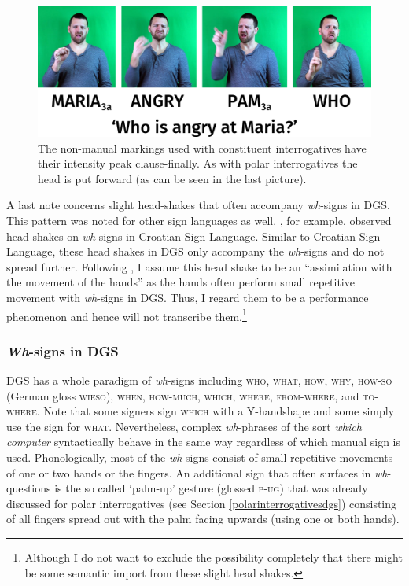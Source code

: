 \begin{figure}[bt]
\centering
	\includegraphics[width=1.0\textwidth]{whnonmanualsexample.jpg}
	\caption{The non-manual markings used with constituent interrogatives have their intensity peak clause-finally. As with polar interrogatives the head is put forward (as can be seen in the last picture).}
	\label{nnmwhatwhotwo}
\end{figure}

A last note concerns slight head-shakes that often accompany \textit{wh}-signs in DGS. This pattern was noted for other sign languages as well. \citet[232--235]{sarac2007cross}, for example, observed head shakes on \textit{wh}-signs in Croatian Sign Language. Similar to Croatian Sign Language, these head shakes in DGS only accompany the \textit{wh}-signs and do not spread further. Following \citet[235]{sarac2007cross}, I assume this head shake to be an ``assimilation with the movement of the hands'' as the hands often perform small repetitive movement with \textit{wh}-signs in DGS. Thus, I regard them to be a performance phenomenon and hence will not transcribe them.\footnote{ Although I do not want to exclude the possibility completely that there might be some semantic import from these slight head shakes.}

\subsubsection{\textit{Wh}-signs in DGS}


DGS has a whole paradigm of \textit{wh}-signs including \textsc{who}, \textsc{what}, \textsc{how}, \textsc{why}, \textsc{how-so} (German gloss \textsc{wieso}), \textsc{when}, \textsc{how-much}, \textsc{which}, \textsc{where}, \textsc{from-where}, and \textsc{to-where}. Note that some signers sign \textsc{which} with a Y-handshape and some simply use the sign for \textsc{what}. Nevertheless, complex \textit{wh}-phrases of the sort \textit{which computer} syntactically behave in the same way regardless of which manual sign is used. Phonologically, most of the \textit{wh}-signs consist of small repetitive movements of one or two hands or the fingers. An additional sign that often surfaces in \textit{wh}-questions is the so called `palm-up' gesture (glossed \textsc{p-ug}) that was already discussed for polar interrogatives (see Section \ref{polarinterrogativesdgs}) consisting of all fingers spread out with the palm facing upwards (using one or both hands). 

